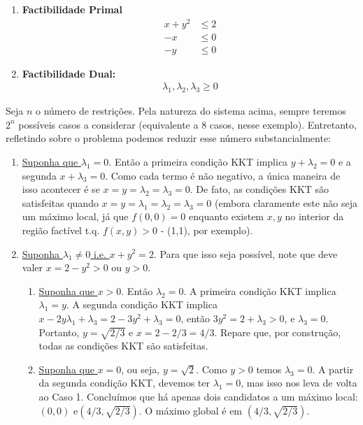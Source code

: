 \begin{enumerate}
{\begin{enumerate}
\begin{align*}
                 -\lambda_2y &= 0 
            \end{align*}
            \item \textbf{Factibilidade Primal}
            \begin{align*}
                x+y^2 &\le 2\\
                -x&\le0\\
                -y&\leq0
            \end{align*}
            \item \textbf{Factibilidade Dual:}
            \begin{align*}
                \lambda_1,\lambda_2,\lambda_3\ge0
            \end{align*}
        \end{enumerate}
        Seja $n$ o número de restrições. Pela natureza do sistema acima, sempre teremos $2^n$ possíveis casos a considerar (equivalente a 8 casos, nesse exemplo). Entretanto, refletindo sobre o problema podemos reduzir esse número substancialmente:
        \begin{enumerate}
            \item[\textbf{Caso 1}] \underline{Suponha que $\lambda_1 = 0$}. Então a primeira condição KKT implica $y + \lambda_2 = 0$ e a segunda $x + \lambda_3 = 0$. Como cada termo é não negativo, a única maneira de isso acontecer é se $x = y = \lambda_2 = \lambda_3 = 0$. De fato, as condições KKT são satisfeitas quando $x = y = \lambda_1 = \lambda_2 = \lambda_3 = 0$ (embora claramente este não seja um máximo local, já que $f(0, 0) = 0$ enquanto existem $x,y$ no interior da região factível t.q. $f(x, y) > 0$ - (1,1), por exemplo).
            \item[\textbf{Caso 2}] \underline{Suponha $\lambda_1 \neq 0$ i.e. $x + y^2 = 2$}. Para que isso seja possível, note que deve valer $x = 2 - y^2>0$ ou $y>0$.
            \begin{enumerate}
                \item[\textbf{Caso 2a)}] \underline{Suponha que $x > 0$}. Então $\lambda_2 = 0$. A primeira condição KKT implica $\lambda_1 = y$. A segunda condição KKT implica $x - 2y\lambda_1 + \lambda_3 = 2 - 3y^2 + \lambda_3 = 0$, então $3y^2 = 2 + \lambda_3 > 0$, e $\lambda_3 = 0$. Portanto, $y = \sqrt{2/3}$ e $x = 2 - 2/3 = 4/3$. Repare que, por construção, todas as condições KKT são satisfeitas.
                \item[\textbf{Caso 2b)}] \underline{Suponha que $x = 0$}, ou seja, $y = \sqrt{2}$. Como $y > 0$ temos $\lambda_3 = 0$. A partir da segunda condição KKT, devemos ter $\lambda_1 = 0$, mas isso nos leva de volta ao Caso 1. Concluímos que há apenas dois candidatos a um máximo local: $(0, 0)$ e$(4/3,\sqrt{2/3})$. O máximo global é em $(4/3,\sqrt{2/3})$.

\end{enumerate}
\end{enumerate}}
\end{enumerate}
